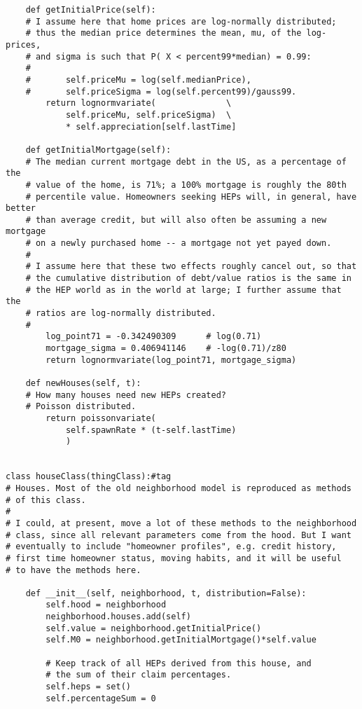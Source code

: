 \begin{lstlisting}
    def getInitialPrice(self):
    # I assume here that home prices are log-normally distributed;
    # thus the median price determines the mean, mu, of the log-prices,
    # and sigma is such that P( X < percent99*median) = 0.99:
    #
    #       self.priceMu = log(self.medianPrice),
    #       self.priceSigma = log(self.percent99)/gauss99. 
        return lognormvariate(              \
            self.priceMu, self.priceSigma)  \
            * self.appreciation[self.lastTime]

    def getInitialMortgage(self):
    # The median current mortgage debt in the US, as a percentage of the
    # value of the home, is 71%; a 100% mortgage is roughly the 80th
    # percentile value. Homeowners seeking HEPs will, in general, have better
    # than average credit, but will also often be assuming a new mortgage
    # on a newly purchased home -- a mortgage not yet payed down.
    #
    # I assume here that these two effects roughly cancel out, so that
    # the cumulative distribution of debt/value ratios is the same in
    # the HEP world as in the world at large; I further assume that the
    # ratios are log-normally distributed.
    #
        log_point71 = -0.342490309      # log(0.71)
        mortgage_sigma = 0.406941146    # -log(0.71)/z80
        return lognormvariate(log_point71, mortgage_sigma)

    def newHouses(self, t):
    # How many houses need new HEPs created?
    # Poisson distributed.
        return poissonvariate(  
            self.spawnRate * (t-self.lastTime)
            )

        
class houseClass(thingClass):#tag
# Houses. Most of the old neighborhood model is reproduced as methods
# of this class.
#
# I could, at present, move a lot of these methods to the neighborhood
# class, since all relevant parameters come from the hood. But I want
# eventually to include "homeowner profiles", e.g. credit history,
# first time homeowner status, moving habits, and it will be useful
# to have the methods here.

    def __init__(self, neighborhood, t, distribution=False):
        self.hood = neighborhood
        neighborhood.houses.add(self)
        self.value = neighborhood.getInitialPrice()
        self.M0 = neighborhood.getInitialMortgage()*self.value

        # Keep track of all HEPs derived from this house, and
        # the sum of their claim percentages.
        self.heps = set()
        self.percentageSum = 0


\end{lstlisting}
